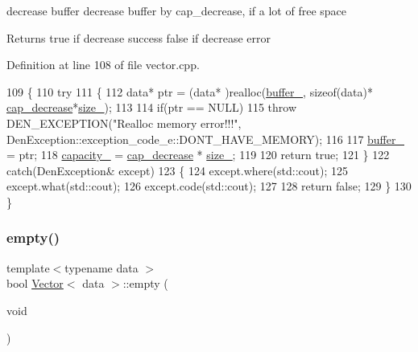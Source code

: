 decrease buffer  decrease buffer by cap\+\_\+decrease, if a lot of free space 

\begin{DoxyReturn}{Returns}
true if decrease success false if decrease error 
\end{DoxyReturn}


Definition at line 108 of file vector.\+cpp.


\begin{DoxyCode}
109     \{
110         \textcolor{keywordflow}{try}
111             \{
112                 data* ptr = (data* )realloc(\hyperlink{classVector_a22db58ae9e92c6014e8ac657804a035a}{buffer\_}, \textcolor{keyword}{sizeof}(data)*
      \hyperlink{classVector_a7c1b2a56c4404a51eeb97e33ec0ca528}{cap\_decrease}*\hyperlink{classVector_a3c70fa478530a90177f2a7e7621ee688}{size\_});
113 
114                 \textcolor{keywordflow}{if}(ptr == NULL)
115                     \textcolor{keywordflow}{throw} DEN\_EXCEPTION(\textcolor{stringliteral}{"Realloc memory error!!!"}, 
      DenException::exception\_code\_e::DONT\_HAVE\_MEMORY);
116 
117                 \hyperlink{classVector_a22db58ae9e92c6014e8ac657804a035a}{buffer\_} = ptr;
118                 \hyperlink{classVector_ad75911bb39018821f0e2911b6905b7ec}{capacity\_} = \hyperlink{classVector_a7c1b2a56c4404a51eeb97e33ec0ca528}{cap\_decrease} * \hyperlink{classVector_a3c70fa478530a90177f2a7e7621ee688}{size\_};
119 
120                 \textcolor{keywordflow}{return} \textcolor{keyword}{true};
121             \}
122         \textcolor{keywordflow}{catch}(DenException& except)
123             \{
124                 except.where(std::cout);
125                 except.what(std::cout);
126                 except.code(std::cout);
127 
128                 \textcolor{keywordflow}{return} \textcolor{keyword}{false};
129             \}
130     \}
\end{DoxyCode}
\mbox{\label{classVector_ae203aae4d9a6dbabd4883c9e6fd84f79}} 
\subsubsection{\texorpdfstring{empty()}{empty()}}
{\footnotesize\ttfamily template$<$typename data $>$ \\
bool \hyperlink{classVector}{Vector}$<$ data $>$\+::empty (\begin{DoxyParamCaption}\item[{void}]{ }\end{DoxyParamCaption})}



